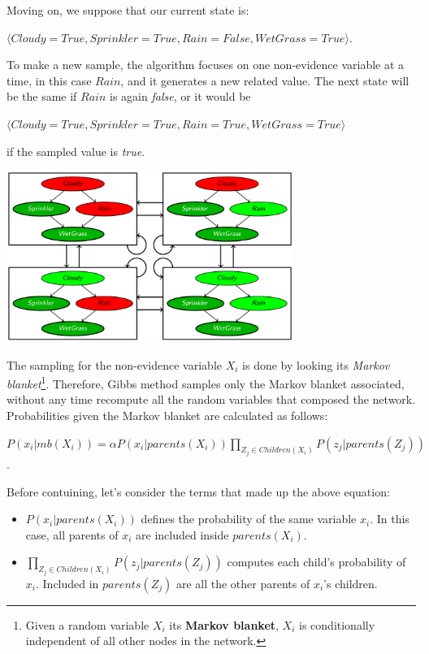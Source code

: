 Moving on, we suppose that our current state is:
\begin{center} \vspace{3.5pt}
    $\langle Cloudy=True, Sprinkler=True, Rain=False, WetGrass=True \rangle$.
\end{center} \vspace{3.5pt}
To make a new sample, the algorithm focuses on one non-evidence variable at a time, in this case $Rain$, and it generates a new related value. The next state will be the same if $Rain$
is again \textit{false}, or it would be 
\begin{center} \vspace{3.5pt}
    $\langle Cloudy=True, Sprinkler=True, Rain=True, WetGrass=True \rangle$
\end{center} \vspace{3.5pt}
if the sampled value is \textit{true}. \vspace{3.5pt}
\begin{center}
    \includegraphics[width=0.7\textwidth]{img/img16.png}
\end{center} \vspace{3.5pt}
The sampling for the non-evidence variable $X_i$ is done by looking its \textit{Markov blanket}\footnote{Given a random variable $X_i$ its \textbf{Markov blanket}, $X_i$ is conditionally independent of all other nodes in the network.}.
Therefore, Gibbs method samples only the Markov blanket associated, without any time recompute all the random variables that composed the network. Probabilities given the Markov
blanket are calculated as follows: \vspace{3.5pt}
\begin{center}
    $P(x_i|mb(X_i)) = \alpha P(x_i|parents(X_i))\prod_{Z_j \in Children(X_i)}P(z_j|parents(Z_j))$.
\end{center} \vspace{3.5pt}
Before contuining, let's consider the terms that made up the above equation:
\begin{itemize}
    \renewcommand{\labelitemi}{-}
    \item $P(x_i|parents(X_i))$ defines the probability of the same variable $x_i$. In this case, all parents of $x_i$ are included inside $parents(X_i)$.  
    \item $\prod_{Z_j \in Children(X_i)}P(z_j|parents(Z_j))$ computes each child's probability of $x_i$. Included in $parents(Z_j)$ are all the other parents of $x_i$'s children.
\end{itemize}

